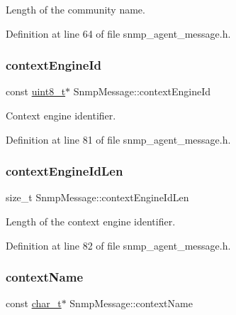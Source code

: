 Length of the community name. 



Definition at line 64 of file snmp\+\_\+agent\+\_\+message.\+h.

\mbox{\label{structSnmpMessage_a737a67e1857fb23d90d149cfb0d21e1c}} 
\subsubsection{\texorpdfstring{context\+Engine\+Id}{contextEngineId}}
{\footnotesize\ttfamily const \hyperlink{stdint_8h_aba7bc1797add20fe3efdf37ced1182c5}{uint8\+\_\+t}$\ast$ Snmp\+Message\+::context\+Engine\+Id}



Context engine identifier. 



Definition at line 81 of file snmp\+\_\+agent\+\_\+message.\+h.

\mbox{\label{structSnmpMessage_ad933640b1912b549e6f1a9280a5ce7b7}} 
\subsubsection{\texorpdfstring{context\+Engine\+Id\+Len}{contextEngineIdLen}}
{\footnotesize\ttfamily size\+\_\+t Snmp\+Message\+::context\+Engine\+Id\+Len}



Length of the context engine identifier. 



Definition at line 82 of file snmp\+\_\+agent\+\_\+message.\+h.

\mbox{\label{structSnmpMessage_ab7b3dc54e8e1538249e1e0e08123f0f9}} 
\subsubsection{\texorpdfstring{context\+Name}{contextName}}
{\footnotesize\ttfamily const \hyperlink{compiler__port_8h_a40bb5262bf908c328fbcfbe5d29d0201}{char\+\_\+t}$\ast$ Snmp\+Message\+::context\+Name}



